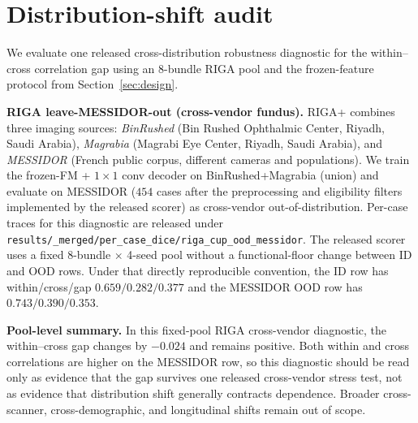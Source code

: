 \section{Distribution-shift audit}
\label{app:distshift}

We evaluate one released cross-distribution robustness diagnostic for the
within--cross correlation gap using an 8-bundle RIGA pool and the frozen-feature
protocol from Section~\ref{sec:design}.

\textbf{RIGA leave-MESSIDOR-out (cross-vendor fundus).} RIGA+ \citep{riga_data} combines three imaging sources: \emph{BinRushed} (Bin Rushed Ophthalmic Center, Riyadh, Saudi Arabia), \emph{Magrabia} (Magrabi Eye Center, Riyadh, Saudi Arabia), and \emph{MESSIDOR} (French public corpus, different cameras and populations). We train the frozen-FM + $1{\times}1$ conv decoder on BinRushed+Magrabia (union) and evaluate on MESSIDOR ($454$ cases after the preprocessing and eligibility filters implemented by the released scorer) as cross-vendor out-of-distribution. Per-case traces for this diagnostic are released under \texttt{results/\_merged/per\_case\_dice/riga\_cup\_ood\_messidor}. The released scorer uses a fixed 8-bundle $\times$ 4-seed pool without a functional-floor change between ID and OOD rows. Under that directly reproducible convention, the ID row has within/cross/gap $0.659/0.282/0.377$ and the MESSIDOR OOD row has $0.743/0.390/0.353$.

\textbf{Pool-level summary.} In this fixed-pool RIGA cross-vendor diagnostic, the within--cross gap changes by $-0.024$ and remains positive. Both within and cross correlations are higher on the MESSIDOR row, so this diagnostic should be read only as evidence that the gap survives one released cross-vendor stress test, not as evidence that distribution shift generally contracts dependence. Broader cross-scanner, cross-demographic, and longitudinal shifts remain out of scope.

